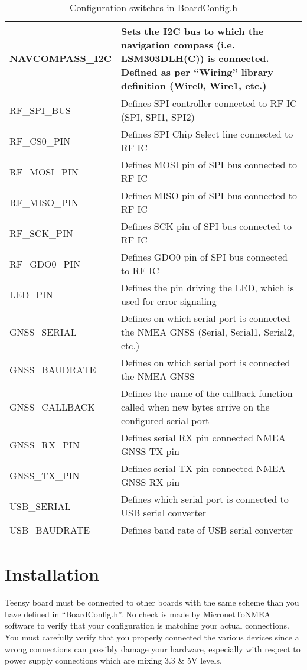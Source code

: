 \documentclass{report}
\begin{document}
\begin{table}[h]
	\begin{tabular}{|l|p{12cm}|}
		\hline
		NAVCOMPASS\_I2C & Sets the I2C bus to which the navigation compass (i.e. LSM303DLH(C)) is connected. Defined as per “Wiring” library definition (Wire0, Wire1, etc.)\\
		\hline
		RF\_SPI\_BUS & Defines SPI controller connected to RF IC (SPI, SPI1, SPI2)\\
		\hline
		RF\_CS0\_PIN & Defines SPI Chip Select line connected to RF IC\\
		\hline
		RF\_MOSI\_PIN & Defines MOSI pin of SPI bus connected to RF IC\\
		\hline
		RF\_MISO\_PIN & Defines MISO pin of SPI bus connected to RF IC\\
		\hline
		RF\_SCK\_PIN & Defines SCK pin of SPI bus connected to RF IC\\
		\hline
		RF\_GDO0\_PIN & Defines GDO0 pin of SPI bus connected to RF IC\\
		\hline
		LED\_PIN & Defines the pin driving the LED, which is used for error signaling\\
		\hline
		GNSS\_SERIAL & Defines on which serial port is connected the NMEA GNSS (Serial, Serial1, Serial2, etc.)\\
		\hline
		GNSS\_BAUDRATE & Defines on which serial port is connected the NMEA GNSS\\
		\hline
		GNSS\_CALLBACK & Defines the name of the callback function called when new bytes arrive on the
		configured serial port\\
		\hline
		GNSS\_RX\_PIN & Defines serial RX pin connected NMEA GNSS TX pin\\
		\hline
		GNSS\_TX\_PIN & Defines serial TX pin connected NMEA GNSS RX pin\\
		\hline
		USB\_SERIAL & Defines which serial port is connected to USB serial converter\\
		\hline
		USB\_BAUDRATE & Defines baud rate of USB serial converter\\
		\hline
\end{tabular}
	\caption{Configuration switches in BoardConfig.h}
\label{table:configswitches}
\end{table}

\chapter{Installation}

Teensy board must be connected to other boards with the same scheme than you have defined in “BoardConfig.h”. No check is made by MicronetToNMEA software to verify that your configuration is matching your actual connections. You must carefully verify that you properly connected the various devices since a wrong connections can possibly damage your hardware, especially with respect to power supply connections which are mixing 3.3 \& 5V levels.
\end{document}
